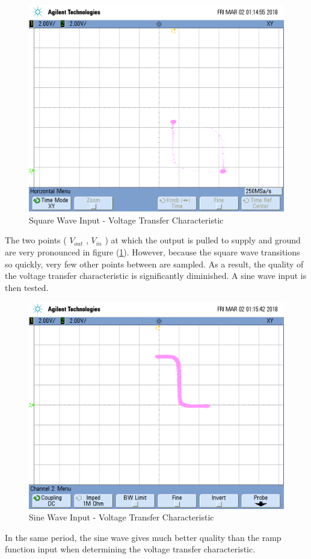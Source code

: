 \FloatBarrier

\begin{figure}[h!]
	\centering
	\includegraphics[scale=0.50]{../images/square_wave_vtc.png}
	\caption{Square Wave Input - Voltage Transfer Characteristic}
	\label{fig:square_wave_vtc}
\end{figure}

\FloatBarrier

The two points ( $V_{out}$ , $V_{in}$ ) at which the output is pulled to supply and ground are very pronounced in figure (\ref{fig:square_wave_vtc}).
However, because the square wave transitions so quickly, very few other points between are sampled.
As a result, the quality of the voltage transfer characteristic is significantly diminished.
A sine wave input is then tested.

\FloatBarrier

\begin{figure}[h!]
	\centering
	\includegraphics[scale=0.50]{../images/sine_wave_input_vtc.png}
	\caption{Sine Wave Input - Voltage Transfer Characteristic}
	\label{fig:sine_wave_input_vtc}
\end{figure}

\FloatBarrier

In the same period, the sine wave gives much better quality than the ramp function input when determining the voltage transfer characteristic.
